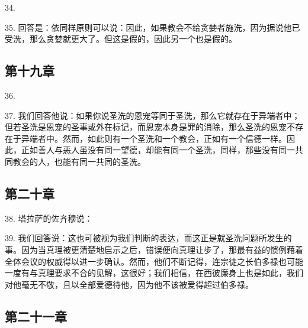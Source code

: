 34. \par

35. 回答是：依同样原则可以说：因此，如果教会不给贪婪者施洗，因为据说他已受洗，那么贪婪就更大了。但这是假的，因此另一个也是假的。\par


\subsection{第十九章}

36. \par

37. 我们回答他说：如果你说圣洗的恩宠等同于圣洗，那么它就存在于异端者中；但若圣洗是恩宠的圣事或外在标记，而恩宠本身是罪的消除，那么圣洗的恩宠不存在于异端者中。然而，如此则有一个圣洗和一个教会，正如有一个信德一样。因此，正如善人与恶人虽没有同一望德，却能有同一个圣洗，同样，那些没有同一共同教会的人，也能有同一共同的圣洗。\par


\subsection{第二十章}

38. 塔拉萨的佐齐穆说：\par

39. 我们回答说：这也可被视为我们判断的表达，而这正是就圣洗问题所发生的事。因为当真理被更清楚地启示之后，错误便向真理让步了，那最有益的惯例藉着全体会议的权威得以进一步确认。然而，他们不断记得，连宗徒之长伯多禄也可能一度有与真理要求不合的见解，这很好；我们相信，在西彼廉身上也是如此，我们对他毫无不敬，且以全部爱德待他，因为他不该被爱得超过伯多禄。\par


\subsection{第二十一章}

